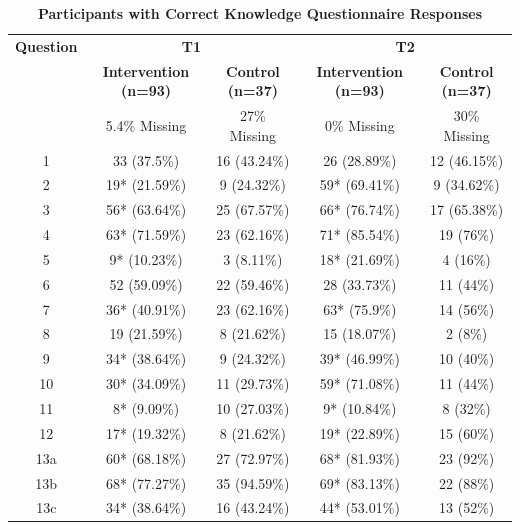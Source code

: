 \documentclass[12pt]{article}
\begin{document}
\begin{table}[htbp]
    \centering
    \captionsetup{justification=raggedright, singlelinecheck=false, skip=0pt, labelfont=bf}
    \caption{\textbf{Participants with Correct Knowledge Questionnaire Responses}}
    \begin{threeparttable}
        \small
        \begin{tabular}{ccccc}
            \toprule
            \textbf{Question} & \multicolumn{2}{c}{\textbf{T1}} & \multicolumn{2}{c}{\textbf{T2}} \\
            \cmidrule(lr){2-3} \cmidrule(lr){4-5}
            & \textbf{Intervention (n=93)} & \textbf{Control (n=37)} & \textbf{Intervention (n=93)} & \textbf{Control (n=37)} \\
            & 5.4\% Missing & 27\% Missing & 0\% Missing & 30\% Missing \\
            \midrule
            1 & 33 (37.5\%) & 16 (43.24\%) & 26 (28.89\%) & 12 (46.15\%) \\
            2 & 19* (21.59\%) & 9 (24.32\%) & 59* (69.41\%) & 9 (34.62\%) \\
            3 & 56* (63.64\%) & 25 (67.57\%) & 66* (76.74\%) & 17 (65.38\%) \\
            4 & 63* (71.59\%) & 23 (62.16\%) & 71* (85.54\%) & 19 (76\%) \\
            5 & 9* (10.23\%) & 3 (8.11\%) & 18* (21.69\%) & 4 (16\%) \\
            6 & 52 (59.09\%) & 22 (59.46\%) & 28 (33.73\%) & 11 (44\%) \\
            7 & 36* (40.91\%) & 23 (62.16\%) & 63* (75.9\%) & 14 (56\%) \\
            8 & 19 (21.59\%) & 8 (21.62\%) & 15 (18.07\%) & 2 (8\%) \\
            9 & 34* (38.64\%) & 9 (24.32\%) & 39* (46.99\%) & 10 (40\%) \\
            10 & 30* (34.09\%) & 11 (29.73\%) & 59* (71.08\%) & 11 (44\%) \\
            11 & 8* (9.09\%) & 10 (27.03\%) & 9* (10.84\%) & 8 (32\%) \\
            12 & 17* (19.32\%) & 8 (21.62\%) & 19* (22.89\%) & 15 (60\%) \\
            13a & 60* (68.18\%) & 27 (72.97\%) & 68* (81.93\%) & 23 (92\%) \\
            13b & 68* (77.27\%) & 35 (94.59\%) & 69* (83.13\%) & 22 (88\%) \\
            13c & 34* (38.64\%) & 16 (43.24\%) & 44* (53.01\%) & 13 (52\%) \\

\end{tabular}
\end{threeparttable}
\end{table}
\end{document}
